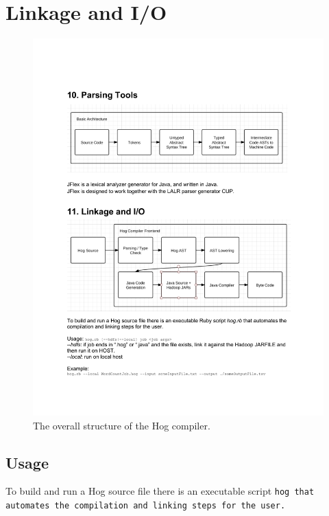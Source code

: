 \documentclass{article}
\begin{document}

\section{Linkage and I/O} %
\label{sec:linkage_and_i_o}

\begin{center}
\begin{figure}
  \label{fig:hog_compiler}
  \includegraphics[width=1.0\textwidth]{img/hog_compiler.pdf}
  \caption{The overall structure of the Hog compiler.}
\end{figure}
\end{center}

\subsection{Usage} %
\label{sub:usage}


To build and run a Hog source file there is an executable script \tt hog
\rm that automates the compilation and linking steps for the user. \\
\end{document}
